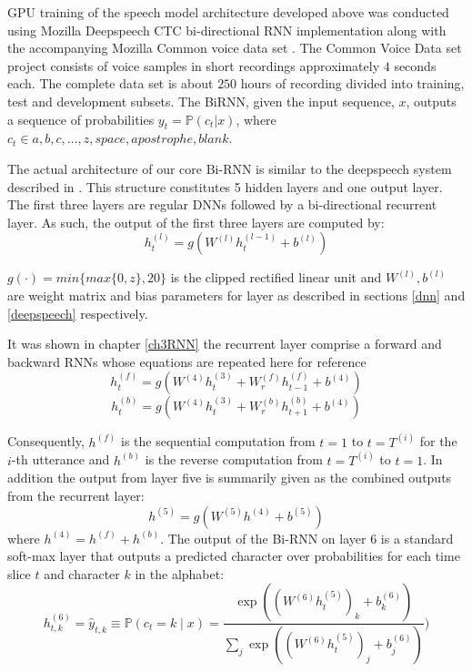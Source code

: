 GPU training of the speech model architecture developed above was conducted using Mozilla Deepspeech \citep{mozilla_2019} CTC bi-directional RNN implementation along with the accompanying Mozilla Common voice data set  \citep{ardila2019common}.  The Common Voice Data set project consists of voice samples in short recordings approximately $4$ seconds each.  The complete data set is about $250$ hours of recording divided into training, test and development subsets.  The BiRNN, given the input sequence, $x$, outputs a sequence of probabilities $y_t=\mathbb{P}(c_t|x)$,  where $c_t \in a,b,c,\dots,z,space,apostrophe,blank$. 

The actual architecture of our core Bi-RNN is similar to the deepspeech system described in \cite{hannun2014deep}. This structure constitutes 5 hidden layers and one output layer.  The first three layers are regular DNNs followed by a bi-directional recurrent layer. As such, the output of the first three layers are computed by:
\begin{equation}
    h^{(l)}_t = g(W^{(l)} h^{(l−1)}_t + b^{(l)})\label{ch06_01_l1-3}
\end{equation}

$g(\cdot) = min\{max\{0,z\},20\}$  is the clipped rectified linear unit and $W^{(l)},b^{(l)}$ are weight matrix and bias parameters for layer  as described in sections \ref{dnn} and \ref{deepspeech} respectively.

It was shown in chapter \ref{ch3RNN} the recurrent layer comprise a forward and backward RNNs whose equations are repeated here for reference
\begin{equation}
    h^{(f)}_t = g(W^{(4)} h^{(3)}_t + W^{(f)}_r h^{(f)}_{t−1} + b^{(4)})
    \label{ch06_02_fwd}
\end{equation}
\begin{equation}
h^{(b)}_t = g(W^{(4)} h^{(3)}_t + W^{(b)}_r h^{(b)}_{t+1} + b^{(4)})    \label{ch06_03_bwd}
\end{equation}

Consequently, $h^{(f)}$ is the sequential computation from $t=1$ to $t=T^{(i)}$ for the $i$-th utterance and $h^{(b)}$ is the reverse computation from $t=T^{(i)}$ to $t=1$.  In addition the output from layer five is summarily given as the combined outputs from the recurrent layer:
\begin{equation}
h^{(5)} = g(W^{(5)} h^{(4)} + b^{(5)})    \label{ch06_04_l5}
\end{equation}
where $h^{(4)} = h^{(f)} + h^{(b)}$. The output of the Bi-RNN on layer 6 is a standard soft-max layer that outputs a predicted character over probabilities for each time slice $t$ and character $k$ in the alphabet:
\begin{equation}
h^{(6)}_{t,k} = \hat{y}_{t,k} \equiv \mathbb{P}(c_t = k \mid x) = \frac{\exp{ \left( (W^{(6)} h^{(5)}_t)_k + b^{(6)}_k \right)}}{\sum_j \exp{\left( (W^{(6)} h^{(5)}_t)_j + b^{(6)}_j \right)}})    \label{ch06_05_l6}
\end{equation}


